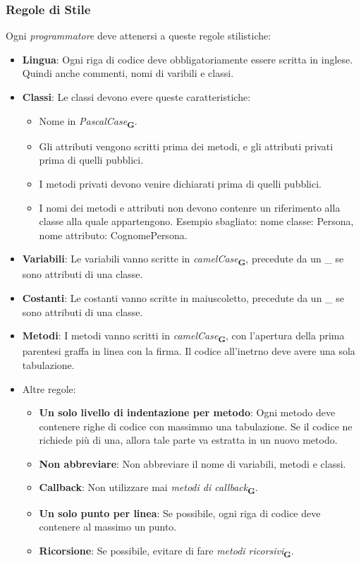 \subsubsection{Regole di Stile}
Ogni \textit{programmatore} deve attenersi a queste regole stilistiche:
\begin{itemize}
    \item \textbf{Lingua}: Ogni riga di codice deve obbligatoriamente essere scritta in inglese. Quindi anche commenti, nomi di varibili e classi.
    \item \textbf{Classi}: Le classi devono evere queste caratteristiche:
          \begin{itemize}
              \item Nome in \textit{PascalCase}\textsubscript{\textbf{G}}.
              \item Gli attributi vengono scritti prima dei metodi, e gli attributi privati prima di quelli pubblici.
              \item I metodi privati devono venire dichiarati prima di quelli pubblici.
              \item I nomi dei metodi e attributi non devono contenre un riferimento alla classe alla quale appartengono. Esempio sbagliato: nome classe: Persona, nome attributo: CognomePersona.
          \end{itemize}
    \item \textbf{Variabili}: Le variabili vanno scritte in \textit{camelCase}\textsubscript{\textbf{G}}, precedute da un \_ se sono attributi di una classe.
    \item \textbf{Costanti}: Le costanti vanno scritte in maiuscoletto, precedute da un \_ se sono attributi di una classe.
    \item \textbf{Metodi}: I metodi vanno scritti in \textit{camelCase}\textsubscript{\textbf{G}}, con l'apertura della prima parentesi graffa in linea con la firma. Il codice all'inetrno deve avere una sola tabulazione.
    \item Altre regole:
          \begin{itemize}
              \item \textbf{Un solo livello di indentazione per metodo}: Ogni metodo deve contenere righe di codice con massimmo una tabulazione. Se il codice ne richiede più di una, allora tale parte va estratta in un nuovo metodo.
              \item \textbf{Non abbreviare}: Non abbreviare il nome di variabili, metodi e classi.
              \item \textbf{Callback}: Non utilizzare mai \textit{metodi di callback}\textsubscript{\textbf{G}}.
              \item \textbf{Un solo punto per linea}: Se possibile, ogni riga di codice deve contenere al massimo un punto.
              \item \textbf{Ricorsione}: Se possibile, evitare di fare \textit{metodi ricorsivi}\textsubscript{\textbf{G}}.
          \end{itemize}
\end{itemize}
